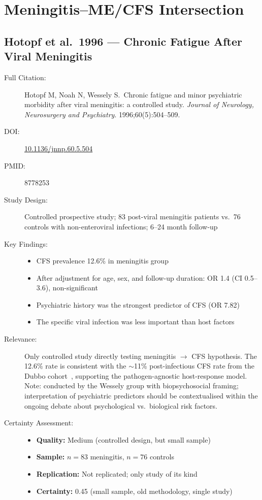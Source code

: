 \section{Meningitis--ME/CFS Intersection}
\label{sec:bib-meningitis-mecfs}

\subsection{Hotopf et al.\ 1996 --- Chronic Fatigue After Viral Meningitis}

\begin{description}
    \item[Full Citation:] Hotopf M, Noah N, Wessely S.\ Chronic fatigue and minor psychiatric morbidity after viral meningitis: a controlled study. \textit{Journal of Neurology, Neurosurgery and Psychiatry}. 1996;60(5):504--509.
    \item[DOI:] \href{https://doi.org/10.1136/jnnp.60.5.504}{10.1136/jnnp.60.5.504}
    \item[PMID:] 8778253
    \item[Study Design:] Controlled prospective study; 83 post-viral meningitis patients vs.\ 76 controls with non-enteroviral infections; 6--24 month follow-up
    \item[Key Findings:]
    \begin{itemize}
        \item CFS prevalence 12.6\% in meningitis group
        \item After adjustment for age, sex, and follow-up duration: OR 1.4 (CI 0.5--3.6), non-significant
        \item Psychiatric history was the strongest predictor of CFS (OR 7.82)
        \item The specific viral infection was less important than host factors
    \end{itemize}
    \item[Relevance:] Only controlled study directly testing meningitis $\to$ CFS hypothesis. The 12.6\% rate is consistent with the $\sim$11\% post-infectious CFS rate from the Dubbo cohort~\cite{Hickie2006postinfectious}, supporting the pathogen-agnostic host-response model. Note: conducted by the Wessely group with biopsychosocial framing; interpretation of psychiatric predictors should be contextualised within the ongoing debate about psychological vs.\ biological risk factors.
    \item[Certainty Assessment:]
    \begin{itemize}
        \item \textbf{Quality:} Medium (controlled design, but small sample)
        \item \textbf{Sample:} $n=83$ meningitis, $n=76$ controls
        \item \textbf{Replication:} Not replicated; only study of its kind
        \item \textbf{Certainty:} 0.45 (small sample, old methodology, single study)
    \end{itemize}
\end{description}

